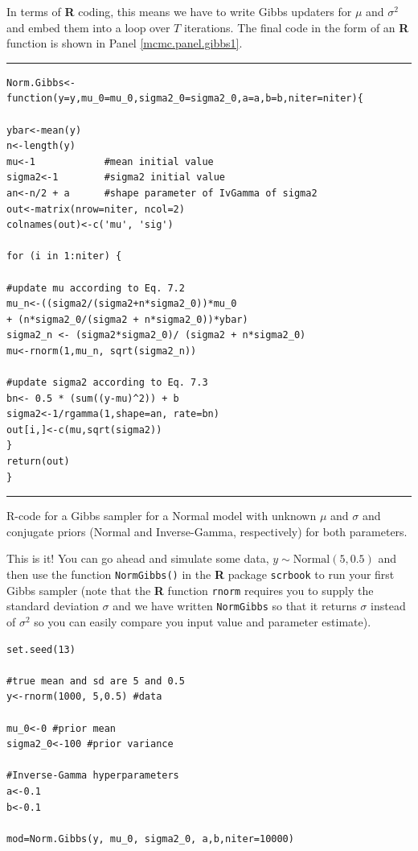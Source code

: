 In terms of {\bf R} coding, this means we have to write Gibbs updaters for
$\mu$ and $\sigma^2$ and embed them into a loop over $T$ iterations. The final
code in the form of an {\bf R} function is shown
in Panel \ref{mcmc.panel.gibbs1}.
\begin{panel}[htp]
\centering
\rule[0.15in]{\textwidth}{.03in}
{\small
\begin{verbatim}
Norm.Gibbs<-function(y=y,mu_0=mu_0,sigma2_0=sigma2_0,a=a,b=b,niter=niter){

ybar<-mean(y)
n<-length(y)
mu<-1            #mean initial value
sigma2<-1        #sigma2 initial value
an<-n/2 + a      #shape parameter of IvGamma of sigma2
out<-matrix(nrow=niter, ncol=2)
colnames(out)<-c('mu', 'sig')

for (i in 1:niter) {

#update mu according to Eq. 7.2
mu_n<-((sigma2/(sigma2+n*sigma2_0))*mu_0
+ (n*sigma2_0/(sigma2 + n*sigma2_0))*ybar)
sigma2_n <- (sigma2*sigma2_0)/ (sigma2 + n*sigma2_0)
mu<-rnorm(1,mu_n, sqrt(sigma2_n))

#update sigma2 according to Eq. 7.3
bn<- 0.5 * (sum((y-mu)^2)) + b
sigma2<-1/rgamma(1,shape=an, rate=bn)
out[i,]<-c(mu,sqrt(sigma2))
}
return(out)
}
\end{verbatim}
}
\rule[-0.15in]{\textwidth}{.03in}
\caption{
R-code for a Gibbs sampler for a Normal model with unknown $\mu$
and $\sigma$ and conjugate priors (Normal and Inverse-Gamma, respectively)
for both parameters.
}
\label{mcmc.panel.gibbs1}
\end{panel}

This is it! You can go ahead and simulate some data, $y \sim \mbox{Normal}(5, 0.5)$ and then use the function \mbox{\tt NormGibbs()} in the {\bf R} package \mbox{\tt scrbook} to run your first Gibbs sampler (note that the {\bf R} function {\tt rnorm} requires you to supply the standard deviation $\sigma$ and we have written {\tt NormGibbs} so that it returns $\sigma$ instead of $\sigma^2$ so you can easily compare you input value and parameter estimate).

\begin{verbatim}
set.seed(13)

#true mean and sd are 5 and 0.5
y<-rnorm(1000, 5,0.5) #data

mu_0<-0 #prior mean
sigma2_0<-100 #prior variance

#Inverse-Gamma hyperparameters
a<-0.1
b<-0.1

mod=Norm.Gibbs(y, mu_0, sigma2_0, a,b,niter=10000)
\end{verbatim}

